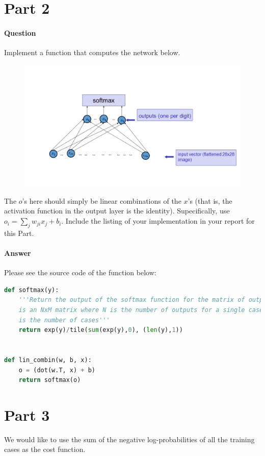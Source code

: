 \documentclass[11pt,twoside]{article}
\begin{document}
\clearpage

\section*{Part 2}

\paragraph{Question}
Implement a function that computes the network below.
\begin{figure}[h]
	\centering
	\includegraphics[scale=0.5]{logreg.png}
\end{figure}
The $o$'s here should simply be linear combinations of the $x$'s (that is, the activation function in the output layer is the identity). Supecifically, use $o_i = \sum_{j}w_{ji}x_j+b_i$. Include the listing of your implementation in your report for this Part.

\paragraph{Answer}
Please see the source code of the function below:

\begin{lstlisting}[language=Python]
def softmax(y):
    '''Return the output of the softmax function for the matrix of output y. y
    is an NxM matrix where N is the number of outputs for a single case, and M
    is the number of cases'''
    return exp(y)/tile(sum(exp(y),0), (len(y),1))


def lin_combin(w, b, x):
    o = (dot(w.T, x) + b)
    return softmax(o)
\end{lstlisting}


\clearpage

\section*{Part 3}
We would like to use the sum of the negative log-probabilities of all the training cases as the cost function.
\end{document}
